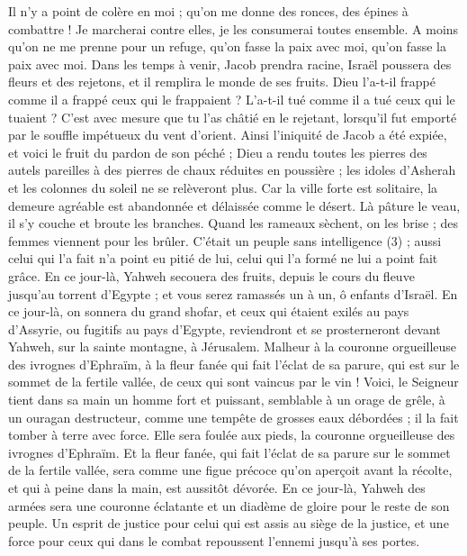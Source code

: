 \begin{multicols}{2}
Il n'y a point de colère en moi ; qu'on me donne des ronces, des épines à combattre ! Je marcherai contre elles, je les consumerai toutes ensemble.
A moins qu’on ne me prenne pour un refuge, qu’on fasse la paix avec moi, qu’on fasse la paix avec moi.
Dans les temps à venir, Jacob prendra racine, Israël poussera des fleurs et des rejetons, et il remplira le monde de ses fruits.
Dieu l’a-t-il frappé comme il a frappé ceux qui le frappaient ? L’a-t-il tué comme il a tué ceux qui le tuaient ?
C’est avec mesure que tu l’as châtié en le rejetant, lorsqu’il fut emporté par le souffle impétueux du vent d’orient.
Ainsi l’iniquité de Jacob a été expiée, et voici le fruit du pardon de son péché ; Dieu a rendu toutes les pierres des autels pareilles à des pierres de chaux réduites en poussière ; les idoles d’Asherah et les colonnes du soleil ne se relèveront plus.
Car la ville forte est solitaire, la demeure agréable est abandonnée et délaissée comme le désert. Là pâture le veau, il s’y couche et broute les branches.
Quand les rameaux sèchent, on les brise ; des femmes viennent pour les brûler. C’était un peuple sans intelligence (3) ; aussi celui qui l’a fait n’a point eu pitié de lui, celui qui l’a formé ne lui a point fait grâce.
En ce jour-là, Yahweh secouera des fruits, depuis le cours du fleuve jusqu'au torrent d'Egypte ; et vous serez ramassés un à un, ô enfants d'Israël.
En ce jour-là, on sonnera du grand shofar, et ceux qui étaient exilés au pays d'Assyrie, ou fugitifs au pays d'Egypte, reviendront et se prosterneront devant Yahweh, sur la sainte montagne, à Jérusalem.
\VerseOne{}Malheur à la couronne orgueilleuse des ivrognes d'Ephraïm, à la fleur fanée qui fait l’éclat de sa parure, qui est sur le sommet de la fertile vallée, de ceux qui sont vaincus par le vin !
Voici, le Seigneur tient dans sa main un homme fort et puissant, semblable à un orage de grêle, à un ouragan destructeur, comme une tempête de grosses eaux débordées ; il la fait tomber à terre avec force.
Elle sera foulée aux pieds, la couronne orgueilleuse des ivrognes d'Ephraïm.
Et la fleur fanée, qui fait l’éclat de sa parure sur le sommet de la fertile vallée, sera comme une figue précoce qu’on aperçoit avant la récolte, et qui à peine dans la main, est aussitôt dévorée.
En ce jour-là, Yahweh des armées sera une couronne éclatante et un diadème de gloire pour le reste de son peuple.
Un esprit de justice pour celui qui est assis au siège de la justice, et une force pour ceux qui dans le combat repoussent l’ennemi jusqu’à ses portes.

\end{multicols}
